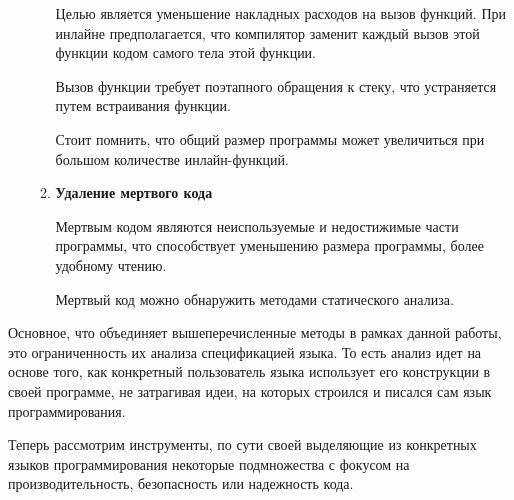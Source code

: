 \documentclass{mipt-thesis-bs}
\begin{document}
\begin{enumerate}
\begin{enumerate}
        Целью является уменьшение накладных расходов на вызов функций.
        При инлайне предполагается, что компилятор заменит каждый вызов этой функции
        кодом самого тела этой функции.

        Вызов функции требует поэтапного обращения к стеку, что устраняется путем
        встраивания функции.

        Стоит помнить, что общий размер программы может увеличиться при большом
        количестве инлайн-функций.

        \item \textbf{Удаление мертвого кода}

        Мертвым кодом являются неиспользуемые и недостижимые части программы, что
         способствует уменьшению размера программы, более
        удобному чтению.

        Мертвый код можно обнаружить методами статического анализа.
    \end{enumerate}
\end{enumerate}

Основное, что объединяет вышеперечисленные методы в рамках данной работы, это ограниченность их
анализа спецификацией языка. То есть анализ идет на основе того, как конкретный пользователь
языка использует его конструкции в своей программе, не затрагивая идеи, на которых строился
и писался сам язык программирования.

Теперь рассмотрим инструменты, по сути своей выделяющие из конкретных языков программирования
некоторые подмножества с фокусом на производительность, безопасность или надежность кода.
\end{document}
